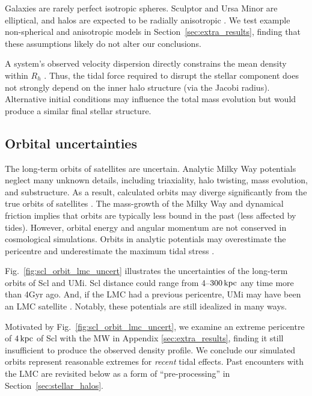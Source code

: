 Galaxies are rarely perfect isotropic spheres. Sculptor and Ursa Minor
are elliptical, and halos are expected to be radially anisotropic
\citep[e.g.,][]{navarro+2010}. We test example non-spherical and
anisotropic models in Section~\ref{sec:extra_results}, finding that
these assumptions likely do not alter our conclusions.

A system's observed velocity dispersion directly constrains the mean
density within \(R_h\) \citep[e.g.,][]{wolf+2010}. Thus, the tidal force
required to disrupt the stellar component does not strongly depend on
the inner halo structure (via the Jacobi radius). Alternative initial
conditions may influence the total mass evolution but would produce a
similar final stellar structure.

\subsection{Orbital uncertainties}\label{orbital-uncertainties}

The long-term orbits of satellites are uncertain. Analytic Milky Way
potentials neglect many unknown details, including triaxiality, halo
twisting, mass evolution, and substructure. As a result, calculated
orbits may diverge significantly from the true orbits of satellites
\citep[e.g.,][]{dsouza+bell2022}. The mass-growth of the Milky Way and
dynamical friction implies that orbits are typically less bound in the
past (less affected by tides). However, orbital energy and angular
momentum are not conserved in cosmological simulations. Orbits in
analytic potentials may overestimate the pericentre and underestimate
the maximum tidal stress \citep[although typically not by enough to
change our conclusions,][]{santistevan+2023, santistevan+2024}.

Fig.~\ref{fig:scl_orbit_lmc_uncert} illustrates the uncertainties of the
long-term orbits of Scl and UMi. Scl distance could range from
4--\(300\,{\rm kpc}\) any time more than 4Gyr ago. And, if the LMC had a
previous pericentre, UMi may have been an LMC satellite
\citep[see][]{vasiliev2024}. Notably, these potentials are still
idealized in many ways.

Motivated by Fig.~\ref{fig:scl_orbit_lmc_uncert}, we examine an extreme
pericentre of \(4\,{\rm kpc}\) of Scl with the MW in Appendix
\ref{sec:extra_results}, finding it still insufficient to produce the
observed density profile. We conclude our simulated orbits represent
reasonable extremes for \emph{recent} tidal effects. Past encounters
with the LMC are revisited below as a form of ``pre-processing'' in
Section~\ref{sec:stellar_halos}.


